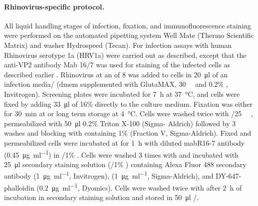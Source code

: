 \paragraph{Rhinovirus-specific protocol.}
All liquid handling stages of infection, fixation, and immunofluorescence staining were performed on the automated pipetting system Well Mate (Thermo Scientific Matrix) and washer Hydrospeed (Tecan). For infection assays with human Rhinovirus serotype 1a (HRV1a) were carried out as described, except that the anti-VP2 antibody Mab 16\slash 7 was used for staining of the infected cells as described earlier \citep{Jurgeit2012,Jurgeit2010,Mosser2002}. Rhinovirus at an  of 8 was added to cells in \SI{20}{\micro\litre} of an infection media\slash {} (\acrshort{dmem} supplemented with GlutaMAX, \SI{30}{\milli\Molar}  and 0.2\% , Invitrogen). Screening plates were incubated for \SI{7}{\hour} at \SI{37}{\celsius}, and cells were fixed by adding \SI{33}{\micro\litre} of 16\%  directly to the culture medium. Fixation was either for \SI{30}{\minute} at  or long term storage at \SI{4}{\celsius}. Cells were washed twice with \slash \SI{25}{\milli\Molar} , permeabilized with \SI{50}{\micro\litre} 0.2\% Triton X-100 (Sigma- Aldrich) followed by 3  washes and blocking with  containing 1\%  (Fraction V, Sigma-Aldrich). Fixed and permeabilized cells were incubated at  for \SI{1}{\hour} with diluted mabR16-7 antibody (\SI{0.45}{\micro\gram\per\milli\litre}) in \slash 1\% . Cells were washed 3 times with  and incubated with \SI{25}{\micro\litre} secondary staining solution (\slash 1\% ) containing Alexa Fluor 488 secondary antibody (\SI{1}{\micro\gram\per\milli\litre}, Invitrogen),  (\SI{1}{\micro\gram\per\milli\litre}, Sigma-Aldrich), and DY-647-phalloidin (\SI{0.2}{\micro\gram\per\milli\litre}, Dyomics). Cells were washed twice with  after \SI{2}{\hour} of incubation in secondary staining solution and stored in \SI{50}{\micro\litre} \slash {}.

